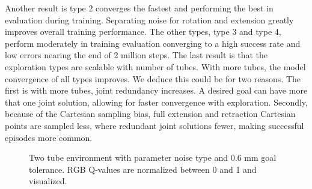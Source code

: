 Another result is type 2 converges the fastest and performing the best in evaluation during training. Separating noise for rotation and extension greatly improves overall training performance. The other types, type 3 and type 4, perform moderately in training evaluation converging to a high success rate and low errors nearing the end of 2 million steps. The last result is that the exploration types are scalable with number of tubes. With more tubes, the model convergence of all types improves. We deduce this could be for two reasons. The first is with more tubes, joint redundancy increases. A desired goal can have more that one joint solution, allowing for faster convergence with exploration. Secondly, because of the Cartesian sampling bias, full extension and retraction Cartesian points are sampled less, where redundant joint solutions fewer, making successful episodes more common.
\begin{figure}
    \caption{Two tube environment with parameter noise type and 0.6 mm goal tolerance. RGB Q-values are normalized between 0 and 1 and visualized.}
    \label{fig:two-tube-pcl}
\end{figure}

